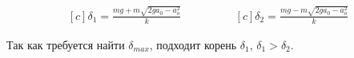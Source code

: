 \documentclass[a5paper,10pt]{article}
\begin{document}
\begin{equation*}
	\begin{aligned}[c]
		\delta_1=\frac{mg+{}m\sqrt{2ga_0-a_o^2}}{k}
	\end{aligned}
		\qquad\qquad
	\begin{aligned}[c]
		\delta_2=\frac{mg-{}m\sqrt{2ga_0-a_o^2}}{k}
	\end{aligned}
\end{equation*}

Так как требуется найти $\delta_{max}$, подходит корень $\delta_1$, $\delta_1>\delta_2$.
\end{document}

